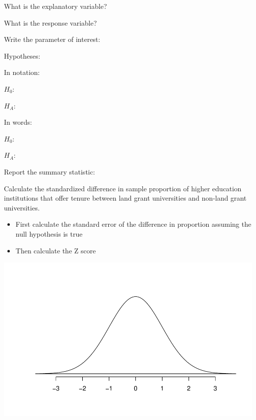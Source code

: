 \documentclass[
]{report}
\providecommand{\tightlist}{%
  \setlength{\itemsep}{0pt}\setlength{\parskip}{0pt}}
\begin{document}
What is the explanatory variable?

\vspace{0.2in}

What is the response variable?

\vspace{0.2in}

Write the parameter of interest:

\vspace{0.8in}

Hypotheses:

In notation:

\(H_0:\)

\vspace{0.2in}

\(H_A:\)

\vspace{0.2in}

In words:

\(H_0:\)

\vspace{0.6in}

\(H_A:\)

\vspace{0.6in}

Report the summary statistic:

\vspace{0.8in}

Calculate the standardized difference in sample proportion of higher education institutions that offer tenure between land grant universities and non-land grant universities.

\begin{itemize}
\tightlist
\item
  First calculate the standard error of the difference in proportion assuming the null hypothesis is true
\end{itemize}

\vspace{0.5in}

\begin{itemize}
\tightlist
\item
  Then calculate the Z score
\end{itemize}

\vspace{0.5in}

\begin{center}\includegraphics[width=0.5\linewidth]{09-LN010-two-cat-theory_files/figure-latex/standNormc-1} \end{center}
\end{document}
